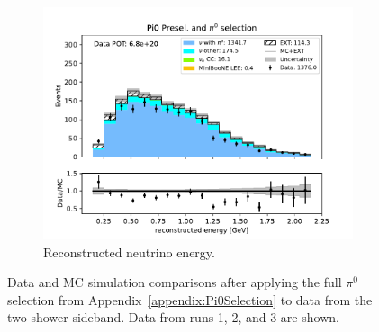 \begin{figure}[H]
\begin{subfigure}{0.33\linewidth}
        \includegraphics[width=\linewidth]{technote/Sidebands/Figures/TwoShowerSideband/two_shr_sideband_reco_e_run123_PI0_PI0.pdf}
        \caption{Reconstructed neutrino energy.}
    \end{subfigure}
    \caption{Data and MC simulation comparisons after applying the full $\pi^0$ selection from Appendix~\ref{appendix:Pi0Selection} to data from the two shower sideband. Data from runs 1, 2, and 3 are shown.}
    \label{fig:Pi0SidebandRuns123}
\end{figure}

